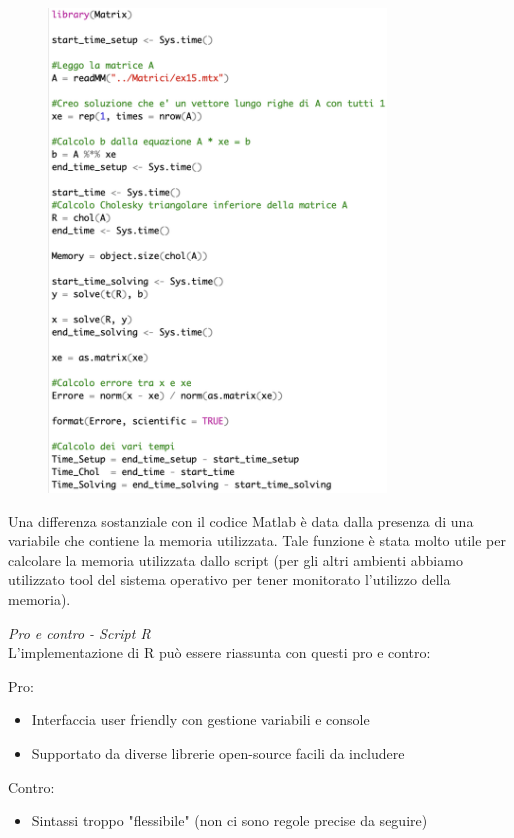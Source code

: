 \documentclass[preprint,12pt]{elsarticle}
\begin{document}
\begin{figure}[H]
	\includegraphics[width=0.80\textwidth]{rcode}
\end{figure}

Una differenza sostanziale con il codice Matlab è data dalla presenza di una variabile che contiene la memoria utilizzata. Tale funzione è stata molto utile per calcolare la memoria utilizzata dallo script (per gli altri ambienti abbiamo utilizzato tool del sistema operativo per tener monitorato l'utilizzo della memoria).
\medskip


\textit{Pro e contro - Script R}\\
\vspace{4mm}
L'implementazione di R può essere riassunta con questi pro e contro:

Pro:
\begin{itemize}
	\item Interfaccia user friendly con gestione variabili e console
	\item Supportato da diverse librerie open-source facili da includere
\end{itemize}

Contro:
\begin{itemize}
	\item Sintassi troppo "flessibile" (non ci sono regole precise da seguire)
\end{itemize}
\end{document}
